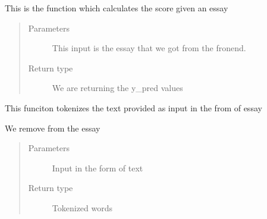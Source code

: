 \documentclass[letterpaper,10pt,english]{sphinxmanual}
\begin{document}

\begin{fulllineitems}
\label{\detokenize{prediction:prediction.predict}}
This is the function which calculates the score given an essay
\begin{quote}\begin{description}
\item[{Parameters}] \leavevmode
{} \textendash{} This input is the essay that we got from the fronend.

\item[{Return type}] \leavevmode
We are returning the y\_pred values

\end{description}\end{quote}

\end{fulllineitems}


\begin{fulllineitems}
\label{\detokenize{prediction:prediction.tokenizeEssay}}
This funciton tokenizes the text provided as input in the from of essay

We remove  from the essay

\begin{sphinxVerbatim}[commandchars=\\\{\}]
  
\end{sphinxVerbatim}
\begin{quote}\begin{description}
\item[{Parameters}] \leavevmode
{} \textendash{} Input in the form of text

\item[{Return type}] \leavevmode
Tokenized words

\end{description}\end{quote}

\end{fulllineitems}
\end{document}
